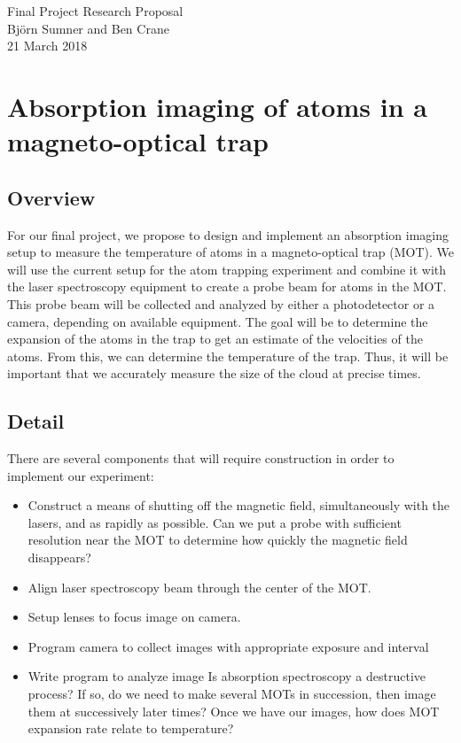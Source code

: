 \documentclass[12pt]{article}
\begin{document}
\begin{center}
{\Large Final Project Research Proposal} \\[.3in]
{\large Bj\"{o}rn Sumner and Ben Crane} \\
{21 March 2018}
\end{center}

\section*{Absorption imaging of atoms in a magneto-optical trap}

\subsection*{Overview}
For our final project, we propose to design and implement an absorption imaging setup to measure the temperature of atoms in a magneto-optical trap (MOT).  We will use the current setup for the atom trapping experiment and combine it with the laser spectroscopy equipment to create a probe beam for atoms in the MOT.  This probe beam will be collected and analyzed by either a photodetector or a camera, depending on available equipment.  The goal will be to determine the expansion of the atoms in the trap to get an estimate of the velocities of the atoms.  From this, we can determine the temperature of the trap.  Thus, it will be important that we accurately measure the size of the cloud at precise times.

\subsection*{Detail}

There are several components that will require construction in order to implement our experiment:

\begin{itemize}
	\item Construct a means of shutting off the magnetic field, simultaneously with the lasers, and as rapidly as possible.
	\subitem Can we put a probe with sufficient resolution near the MOT to determine how quickly the magnetic field disappears?
	\item Align laser spectroscopy beam through the center of the MOT.
	\item Setup lenses to focus image on camera.
	\item Program camera to collect images with appropriate exposure and interval
	\item Write program to analyze image
	\subitem Is absorption spectroscopy a destructive process?
	\subitem If so, do we need to make several MOTs in succession, then image them at successively later times?
	\subitem Once we have our images, how does MOT expansion rate relate to temperature?	
\end{itemize}
\end{document}
